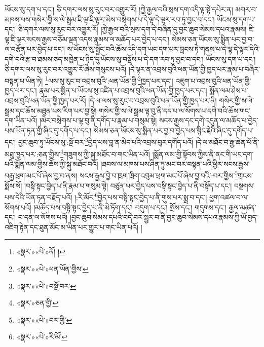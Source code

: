 ཡོངས་སུ་དག་པ་དང་། ཅི་དགར་ལས་སུ་རུང་བར་འགྱུར་རོ། །ཀྱེ་རྒྱལ་བའི་སྲས་དག་འདི་ལྟ་སྟེ་དཔེར་ན། མགར་བ་མཁས་པས་གསེར་གྱི་ས་ལེ་སྦྲམ་ཇི་ལྟ་ཇི་ལྟར་མེས་བསྲེགས་པ་དེ་ལྟ་དེ་ལྟར་རབ་ཏུ་བྱང་བ་དང་། ཡོངས་སུ་དག་པ་དང་། ཅི་དགར་ལས་སུ་རུང་བར་འགྱུར་རོ། །ཀྱེ་རྒྱལ་བའི་སྲས་དག་དེ་བཞིན་དུ་བྱང་ཆུབ་སེམས་དཔའ་རྣམས། ཇི་ལྟ་ཇི་ལྟར་སངས་རྒྱས་བཅོམ་ལྡན་འདས་རྣམས་ལ་མཆོད་པར་བྱེད་པ་དང་། སེམས་ཅན་ཡོངས་སུ་སྨིན་པར་བྱ་བ་ལ་བརྩོན་པར་བྱེད་པ་དང་། ས་ཡོངས་སུ་སྦྱོང་བའི་ཆོས་འདི་དག་ཡང་དག་པར་བླངས་ཏེ་གནས་པ་དེ་ལྟ་དེ་ལྟར་དེའི་དགེ་བའི་རྩ་བ་ཐམས་ཅད་མཁྱེན་པ་ཉིད་དུ་ཡོངས་སུ་བསྔོས་པ་དེ་དག་རབ་ཏུ་བྱང་བ་དང་། ཡོངས་སུ་དག་པ་དང་། ཅི་དགར་ལས་སུ་རུང་བར་འགྱུར་རོ་ཞེས་གསུངས་པའོ། །དེ་ལྟར་ན་འབྲས་བུའི་ཕན་ཡོན་གྱི་ཁྱད་པར་རྣམ་པ་བཞིར་བསྟན་པ་ཡིན་ཏེ། \footnote{«སྣར་»«པེ་»ནོ། ། }ལས་སུ་རུང་བ་འབྲས་བུའི་:ཕན་ཡོན་གྱི་\footnote{«སྣར་»«པེ་»ཕན་ཡོན་གྱིས་}ཁྱད་པར་དང་། འཇུག་པ་འབྲས་བུའི་ཕན་ཡོན་གྱི་ཁྱད་པར་དང་། རྣམ་པར་སྨིན་པ་ཡོངས་སུ་འཛིན་པ་འབྲས་བུའི་ཕན་ཡོན་གྱི་ཁྱད་པར་དང་། སྨོན་ལམ་ཤེས་པ་འབྲས་བུའི་ཕན་ཡོན་གྱི་ཁྱད་པར་རོ། །དེ་ལ་ལས་སུ་རུང་བ་འབྲས་བུའི་ཕན་ཡོན་གྱི་ཁྱད་པར་ནི། གསེར་གྱི་ས་ལེ་སྦྲམ་དང་ཆོས་མཐུན་པས་རིག་པར་བྱ་སྟེ། གསེར་གྱི་ས་ལེ་སྦྲམ་ལྟ་བུ་ནི་དད་པ་ལ་སོགས་པ་དགེ་བའི་ཆོས་གང་དག་ཡིན་པའོ། །མེར་བསྲེགས་པ་ལྟ་བུ་ནི་དགོད་པ་རྣམ་པ་གསུམ་སྟེ། སངས་རྒྱས་དང་དགེ་འདུན་ལ་མཆོད་པ་བྱེད་པས་ཡོན་ཏན་གྱི་ཞིང་དུ་དགོད་པ་དང་། སེམས་ཅན་ཡོངས་སུ་སྨིན་པར་བྱ་བ་བྱེད་པས་སྙིང་རྗེའི་ཞིང་དུ་དགོད་པ་དང་། བྱང་ཆུབ་ཏུ་ཡོངས་སུ་:སྔོ་བར་\footnote{«སྣར་»«པེ་»བསྔོ་བར་}བྱེད་པས་བླ་ན་མེད་པའི་འབྲས་བུར་དགོད་པའོ། །དེ་ལ་མཐོང་བ་རྒྱ་ཆེན་པོ་ནི་མཐུ་ཁྱད་པར་:ཅན་གྱིས་\footnote{«སྣར་»ཅན་གྱི་}གཟུགས་ཀྱི་སྐུ་མཐོང་བ་གང་ཡིན་པའོ། །སྨོན་ལམ་གྱི་སྟོབས་ཀྱིས་ནི་ནང་གི་ཡང་དག་པའི་སྨོན་ལམ་གྱིས་ཆོས་ཀྱི་སྐུ་མཐོང་བའོ། །ཐབས་ལ་མཁས་པས་ཤིན་ཏུ་མང་བར་བསྟན་པའི་ཕྱིར་སངས་རྒྱས་བརྒྱ་ཕྲག་མང་པོ་ཞེས་བྱ་བ་ནས། སངས་རྒྱས་བྱེ་བ་ཁྲག་ཁྲིག་འབུམ་ཕྲག་མང་པོ་ཞེས་བྱ་བའི་:བར་གྱིས་\footnote{«སྣར་»«པེ་»བར་གྱི་}གྲངས་སྨོས་སོ། །བསྟི་སྟང་བྱེད་པ་ནི་རྣམ་པ་གསུམ་སྟེ། བཙུན་པར་བྱེད་པས་བསྟི་སྟང་བྱེད་པ་ནི་བསྟོད་པ་དང་། བསྔགས་པས་དེའི་ཡོན་ཏན་བརྗོད་པའོ། །:རི་མོར་\footnote{«སྣར་»«པེ་»རི་མོ་}བྱེད་པས་བསྟི་སྟང་བྱེད་པ་ནི་གུས་པར་སྨྲ་བ་དང་། ཕྱག་འཚལ་བ་ལ་སོགས་པའོ། །མཆོད་པས་བསྟི་སྟང་བྱེད་པ་ནི་མེ་ཏོག་དང་། བདུག་པ་དང་། སྤོས་དང་། གདུགས་དང་། རྒྱལ་མཚན་དང་། བ་དན་ལ་སོགས་པའོ། །བྱང་ཆུབ་སེམས་དཔའི་བདེ་བར་སྦྱར་བ་ནི་བྱང་ཆུབ་སེམས་དཔའ་རྣམས་ཀྱི་ཡོ་བྱད་འཇིག་རྟེན་དང་ཐུན་མོང་མ་ཡིན་པར་གྱུར་པ་གང་ཡིན་པའོ། །
